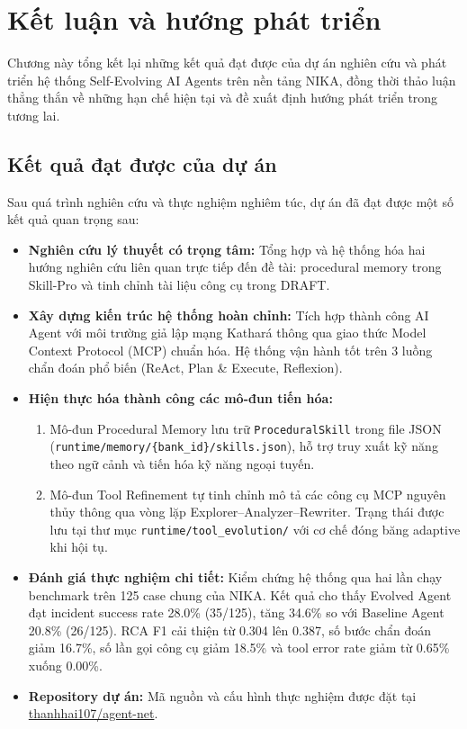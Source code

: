 \chapter{Kết luận và hướng phát triển}
\label{chap:conclusion}

Chương này tổng kết lại những kết quả đạt được của dự án nghiên cứu và phát triển hệ thống Self-Evolving AI Agents trên nền tảng NIKA, đồng thời thảo luận thẳng thắn về những hạn chế hiện tại và đề xuất định hướng phát triển trong tương lai.

\section{Kết quả đạt được của dự án}
\label{sec:accomplishments}

Sau quá trình nghiên cứu và thực nghiệm nghiêm túc, dự án đã đạt được một số kết quả quan trọng sau:
\begin{itemize}
    \item \textbf{Nghiên cứu lý thuyết có trọng tâm:} Tổng hợp và hệ thống hóa hai hướng nghiên cứu liên quan trực tiếp đến đề tài: procedural memory trong Skill-Pro và tinh chỉnh tài liệu công cụ trong DRAFT.
    \item \textbf{Xây dựng kiến trúc hệ thống hoàn chỉnh:} Tích hợp thành công AI Agent với môi trường giả lập mạng Kathará thông qua giao thức Model Context Protocol (MCP) chuẩn hóa. Hệ thống vận hành tốt trên 3 luồng chẩn đoán phổ biến (ReAct, Plan \& Execute, Reflexion).
    \item \textbf{Hiện thực hóa thành công các mô-đun tiến hóa:}
        \begin{enumerate}
            \item Mô-đun Procedural Memory lưu trữ \texttt{ProceduralSkill} trong file JSON (\texttt{runtime/memory/\{bank\_id\}/skills.json}), hỗ trợ truy xuất kỹ năng theo ngữ cảnh và tiến hóa kỹ năng ngoại tuyến.
            \item Mô-đun Tool Refinement tự tinh chỉnh mô tả các công cụ MCP nguyên thủy thông qua vòng lặp Explorer--Analyzer--Rewriter. Trạng thái được lưu tại thư mục \texttt{runtime/tool\_evolution/} với cơ chế đóng băng adaptive khi hội tụ.
        \end{enumerate}
    \item \textbf{Đánh giá thực nghiệm chi tiết:} Kiểm chứng hệ thống qua hai lần chạy benchmark trên 125 case chung của NIKA. Kết quả cho thấy Evolved Agent đạt incident success rate 28.0\% (35/125), tăng 34.6\% so với Baseline Agent 20.8\% (26/125). RCA F1 cải thiện từ 0.304 lên 0.387, số bước chẩn đoán giảm 16.7\%, số lần gọi công cụ giảm 18.5\% và tool error rate giảm từ 0.65\% xuống 0.00\%.
    \item \textbf{Repository dự án:} Mã nguồn và cấu hình thực nghiệm được đặt tại \href{https://github.com/thanhhai107/agent-net}{thanhhai107/agent-net}.
\end{itemize}

